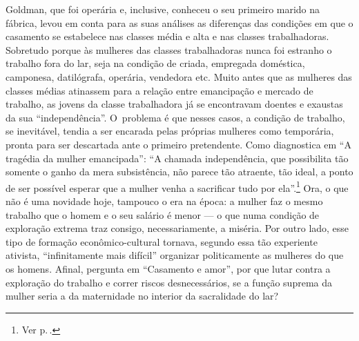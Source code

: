 Goldman, que foi operária e, inclusive, conheceu o seu primeiro
marido na fábrica, levou em conta para as 
suas análises as diferenças das condições em que o casamento se
estabelece nas classes média e alta e nas classes
trabalhadoras. Sobretudo porque às mulheres das classes
trabalhadoras nunca foi estranho o trabalho fora do lar, seja na
condição de criada, empregada doméstica, camponesa, datilógrafa,
operária, vendedora etc. Muito antes que as mulheres das classes médias
atinassem para a relação entre emancipação e mercado de trabalho, as
jovens da classe trabalhadora já se encontravam doentes e exaustas da
sua ``independência''. O~problema é que nesses casos, a condição de
trabalho, se inevitável, tendia a ser encarada pelas próprias mulheres
como temporária, pronta para ser descartada ante o primeiro pretendente.
Como diagnostica em ``A tragédia da mulher emancipada'': ``A
chamada independência, que possibilita tão somente o ganho da mera
subsistência, não parece tão atraente, tão ideal, a ponto de ser possível
esperar que a mulher venha a sacrificar tudo por ela''.\footnote{Ver p.\,\pageref{ganho}.} Ora, o que não é
uma novidade hoje, tampouco o era na época: a mulher faz o mesmo
trabalho que o homem e o seu salário é menor --- o que numa condição de
exploração extrema traz consigo, necessariamente, a miséria. Por outro
lado, esse tipo de formação econômico-cultural tornava, segundo essa tão
experiente ativista, ``infinitamente mais difícil'' organizar
politicamente as mulheres do que os homens. Afinal, pergunta em
``Casamento e amor'', por que lutar contra a exploração do trabalho e
correr riscos desnecessários, se a função suprema da mulher seria a da
maternidade no interior da sacralidade do lar?

